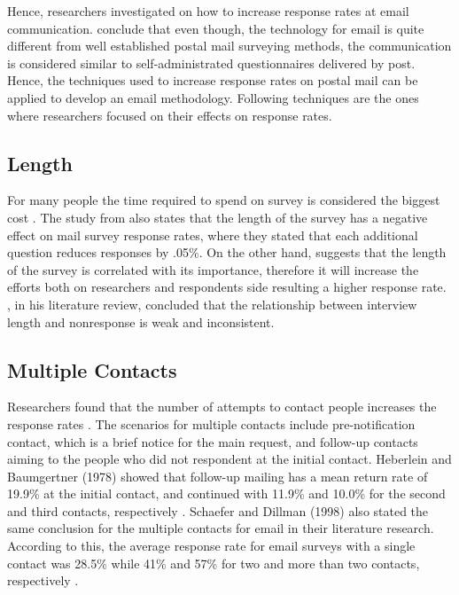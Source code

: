 Hence, researchers investigated on how to increase response rates at email communication. \cite{Schaefer1998} conclude that even though, the technology for email is quite different from well established postal mail surveying methods, the communication is considered similar to self-administrated questionnaires delivered by post. Hence, the techniques used to increase response rates on postal mail can be applied to develop an email methodology. Following techniques are the ones where researchers focused on their effects on response rates.

\subsection{Length}
\label{sec:2.2.1:Leng}
For many people the time required to spend on survey is considered the biggest cost \citep[page 26]{DillmanDonA.SmythJoleneD.Christian2009}. The study from \cite{Heberlein1978} also states that the length of the survey has a negative effect on mail survey response rates, where they stated that each additional question reduces responses by .05\%. On the other hand, \cite{Bradburn1978} suggests that the length of the survey is correlated with its importance, therefore it will increase the efforts both on researchers and respondents side resulting a higher response rate. \cite{Bogen1996}, in his literature review, concluded that the relationship between interview length and nonresponse is weak and inconsistent.

\subsection{Multiple Contacts}
\label{sec:2.2.2:MultCont}
Researchers found that the number of attempts to contact people increases the response rates \citep{Heberlein1978,Schaefer1998}. The scenarios for multiple contacts include pre-notification contact, which is a brief notice for the main request, and follow-up contacts aiming to the people who did not respondent at the initial contact. Heberlein and Baumgertner (1978) showed that follow-up mailing has a mean return rate of 19.9\% at the initial contact, and continued with 11.9\% and 10.0\% for the second and third contacts, respectively \citep{Heberlein1978}. Schaefer and Dillman (1998) also stated the same conclusion for the multiple contacts for email in their literature research. According to this, the average response rate for email surveys with a single contact was 28.5\% while 41\% and 57\% for two and more than two contacts, respectively \citep{Schaefer1998}.

